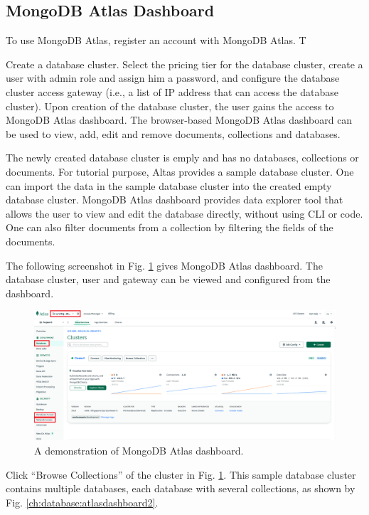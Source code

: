 \subsection{MongoDB Atlas Dashboard}

To use MongoDB Atlas, register an account with MongoDB Atlas. T

Create a database cluster. Select the pricing tier for the database cluster, create a user with admin role and assign him a password, and configure the database cluster access gateway (i.e., a list of IP address that can access the database cluster). Upon creation of the database cluster, the user gains the access to MongoDB Atlas dashboard. The browser-based MongoDB Atlas dashboard can be used to view, add, edit and remove documents, collections and databases.

The newly created database cluster is emply and has no databases, collections or documents. For tutorial purpose, Altas provides a sample database cluster. One can import the data in the sample database cluster into the created empty database cluster. MongoDB Atlas dashboard provides data explorer tool that allows the user to view and edit the database directly, without using CLI or code. One can also filter documents from a collection by filtering the fields of the documents.

The following screenshot in Fig. \ref{ch:database:atlasdashboard} gives MongoDB Atlas dashboard. The database cluster, user and gateway can be viewed and configured from the dashboard.

\begin{figure}[htbp]
	\centering
	\includegraphics[width=\textwidth]{chapters/part-3/figures/atlas_dashboard.png}
	\caption{A demonstration of MongoDB Atlas dashboard.} \label{ch:database:atlasdashboard}
\end{figure}

Click ``Browse Collections'' of the cluster in Fig. \ref{ch:database:atlasdashboard}. This sample database cluster contains multiple databases, each database with several collections, as shown by Fig. \ref{ch:database:atlasdashboard2}.

